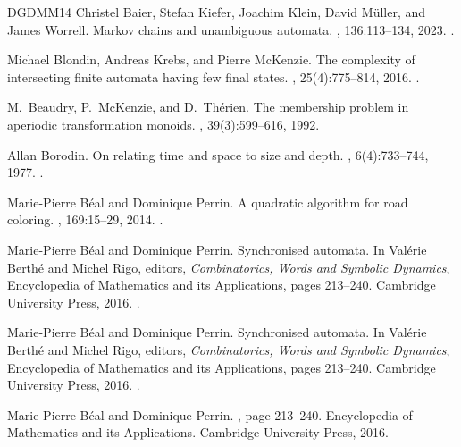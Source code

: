 \documentclass[11pt,a4paper]{amsart}
\theoremstyle{plain}
\theoremstyle{definition}
\theoremstyle{defC}
\theoremstyle{thmC}
\theoremstyle{plain}
\numberwithin{equation}{section}
\begin{document}
\begin{thebibliography}{DGDMM14}
Christel Baier, Stefan Kiefer, Joachim Klein, David M{\"{u}}ller, and James
  Worrell.
\newblock Markov chains and unambiguous automata.
, 136:113--134, 2023.
\newblock \href {https://doi.org/10.1016/J.JCSS.2023.03.005}
  {}.

Michael Blondin, Andreas Krebs, and Pierre McKenzie.
\newblock The complexity of intersecting finite automata having few final
  states.
, 25(4):775--814, 2016.
\newblock \href {https://doi.org/10.1007/s00037-014-0089-9}
  {}.

M.~Beaudry, P.~McKenzie, and D.~Th\'{e}rien.
\newblock The membership problem in aperiodic transformation monoids.
, 39(3):599--616, 1992.

Allan Borodin.
\newblock On relating time and space to size and depth.
, 6(4):733--744, 1977.
\newblock \href {https://doi.org/10.1137/0206054} {}.

Marie{-}Pierre B{\'{e}}al and Dominique Perrin.
\newblock A quadratic algorithm for road coloring.
, 169:15--29, 2014.
\newblock \href {https://doi.org/10.1016/J.DAM.2013.12.002}
  {}.

Marie-Pierre B\'{e}al and Dominique Perrin.
\newblock Synchronised automata.
\newblock In Val\'{e}rie Berth\'{e} and Michel Rigo, editors, {\em
  Combinatorics, Words and Symbolic Dynamics}, Encyclopedia of Mathematics and
  its Applications, pages 213--240. Cambridge University Press, 2016.
\newblock \href {https://doi.org/10.1017/CBO9781139924733.008}
  {}.

Marie-Pierre B\'{e}al and Dominique Perrin.
\newblock Synchronised automata.
\newblock In Val\'{e}rie Berth\'{e} and Michel Rigo, editors, {\em
  Combinatorics, Words and Symbolic Dynamics}, Encyclopedia of Mathematics and
  its Applications, pages 213--240. Cambridge University Press, 2016.
\newblock \href {https://doi.org/10.1017/CBO9781139924733.008}
  {}.

Marie-Pierre B{\'e}al and Dominique Perrin.
, page 213–240.
\newblock Encyclopedia of Mathematics and its Applications. Cambridge
  University Press, 2016.


\end{thebibliography}
\end{document}
